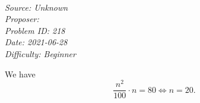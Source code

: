 \SSbreak\\
\emph{Source: Unknown}\\
\emph{Proposer: \Pnjoy}\\ %
\emph{Problem ID: 218}\\
\emph{Date: 2021-06-28}\\
\emph{Difficulty: Beginner}\\
\SSbreak

\bigskip

\begin{solution}\hfil\medskip
  
    We have $$\frac{n^2}{100} \cdot n = 80 \iff n = \boxed{20}.$$
\end{solution}\bigskip
